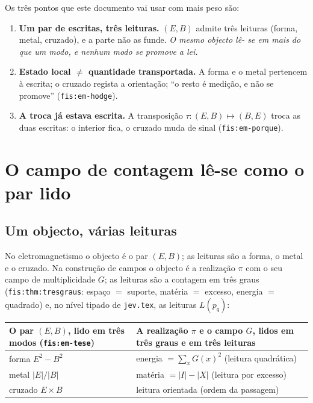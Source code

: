 \documentclass[11pt,a4paper]{article}
\newcommand{\abs}[1]{\lvert #1\rvert}
\begin{document}
Os três pontos que este documento vai usar com mais peso são:

\begin{enumerate}[leftmargin=1.5em]
\item \textbf{Um par de escritas, três leituras.} $(E,B)$ admite três leituras
      (forma, metal, cruzado), e a parte não as funde. \emph{O mesmo objecto lê-
      se em mais do que um modo, e nenhum modo se promove a lei.}
\item \textbf{Estado local $\neq$ quantidade transportada.} A forma e o metal
      pertencem à escrita; o cruzado regista a orientação; ``o resto é medição,
      e não se promove'' (\texttt{fis:em-hodge}).
\item \textbf{A troca já estava escrita.} A transposição $\tau\colon(E,B)%
      \mapsto(B,E)$ troca as duas escritas: o interior fica, o cruzado muda de
      sinal (\texttt{fis:em-porque}).
\end{enumerate}

\section{O campo de contagem lê-se como o par lido}\label{sec:paralelo}

\subsection{Um objecto, várias leituras}

No eletromagnetismo o objecto é o par $(E,B)$; as leituras são a forma, o metal
e o cruzado. Na construção de campos o objecto é a realização $\pi$ com o seu
campo de multiplicidade $G$; as leituras são a contagem em três graus
(\texttt{fis:thm:tresgraus}: espaço $=$ suporte, matéria $=$ excesso, energia
$=$ quadrado) e, no nível tipado de \texttt{jev.tex}, as leituras $L(p_q)$:

\begin{center}\small
\begin{tabular}{@{}p{}p{}@{}}
\toprule
O par $(E,B)$, lido em três modos (\texttt{fis:em-tese}) &
A realização $\pi$ e o campo $G$, lidos em três graus e em três leituras \\
\midrule
forma $E^{2}-B^{2}$ & energia $=\sum_x G(x)^{2}$ (leitura quadrática) \\
metal $\abs{E}/\abs{B}$ & matéria $=|I|-|X|$ (leitura por excesso) \\
cruzado $E\times B$ & leitura orientada (ordem da passagem) \\
\bottomrule
\end{tabular}
\end{center}
\end{document}
